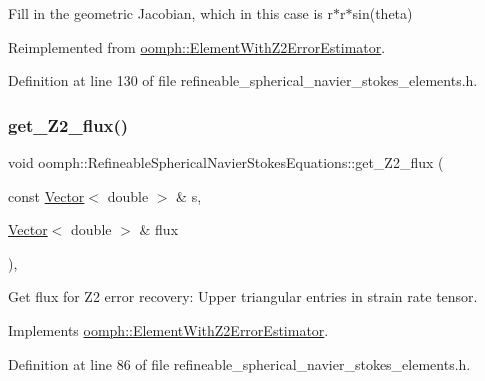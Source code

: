 Fill in the geometric Jacobian, which in this case is r$\ast$r$\ast$sin(theta) 



Reimplemented from \hyperlink{classoomph_1_1ElementWithZ2ErrorEstimator_ad2add457436f34d0d4b9e48900be309c}{oomph\+::\+Element\+With\+Z2\+Error\+Estimator}.



Definition at line 130 of file refineable\+\_\+spherical\+\_\+navier\+\_\+stokes\+\_\+elements.\+h.

\mbox{\label{classoomph_1_1RefineableSphericalNavierStokesEquations_ae0b6940ca1e05e042dae71b185e995b5}} 
\subsubsection{\texorpdfstring{get\+\_\+\+Z2\+\_\+flux()}{get\_Z2\_flux()}}
{\footnotesize\ttfamily void oomph\+::\+Refineable\+Spherical\+Navier\+Stokes\+Equations\+::get\+\_\+\+Z2\+\_\+flux (\begin{DoxyParamCaption}\item[{const \hyperlink{classoomph_1_1Vector}{Vector}$<$ double $>$ \&}]{s,  }\item[{\hyperlink{classoomph_1_1Vector}{Vector}$<$ double $>$ \&}]{flux }\end{DoxyParamCaption})\hspace{0.3cm}{\ttfamily [inline]}, {\ttfamily [virtual]}}



Get \textquotesingle{}flux\textquotesingle{} for Z2 error recovery\+: Upper triangular entries in strain rate tensor. 



Implements \hyperlink{classoomph_1_1ElementWithZ2ErrorEstimator_a5688ff5f546d81771cabad82ca5a7556}{oomph\+::\+Element\+With\+Z2\+Error\+Estimator}.



Definition at line 86 of file refineable\+\_\+spherical\+\_\+navier\+\_\+stokes\+\_\+elements.\+h.



